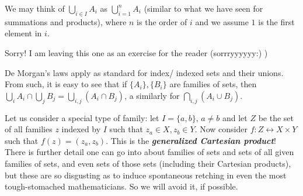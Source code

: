 \documentclass{report}
\begin{document}
We may think of \(\bigcup_{i \in  I}  A_i\) as \(\bigcup^n_{i = 1}  A_i\) (similar to what we have seen for summations and products), where \(n\) is the order of \(i\) and we assume \(1\) is the first element in \(i\).





Sorry! I am leaving this one as an exercise for the reader (sorrryyyyyy:) )


De Morgan's laws apply as standard for index/ indexed sets and their unions. From such, it is easy to see that if \(\{A_i\}, \{B_i\}\) are families of sets, then \(\bigcup_{i} A_i \cap \bigcup_j B_j = \bigcup_{i,j} (A_i \cap  B_j)\), a similarly for \(\bigcap_{i,j}  (A_i  \cup B_j)\).

Let us consider a special type of family: let \(I=\{a,b\}, \, a\neq b\) and let \(Z\) be the set of all families \(z\) indexed by \(I\) such that \(z_a \in X, z_b \in Y\). Now consider \(f : Z \leftrightarrow X \times Y\) such that \(f(z)=(z_a,z_b)\). This is the \textbf{\emph{generalized Cartesian product}}! There is further detail one can go into about families of sets and sets of all given families of sets, and even sets of those sets (including their Cartesian products), but these are so disgusting as to induce spontaneous retching in even the most tough-stomached mathematicians. So we will avoid it, if possible.
\end{document}
